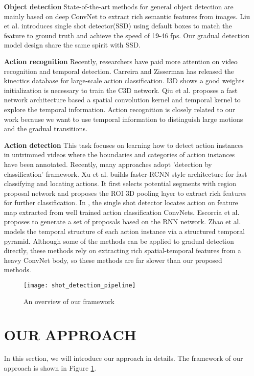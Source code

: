 \documentclass[runningheads]{llncs}
\begin{document}
\textbf{Object detection} State-of-the-art methods for general object detection are mainly based on deep ConvNet to extract rich semantic features from images. Liu et al.\cite{liu2016ssd} introduces single shot detector(SSD) using default boxes to match the feature to ground truth and achieve the speed of 19-46 fps. Our gradual detection model design share the same spirit with SSD.

\textbf{Action recognition} Recently, researchers have paid more attention on video recognition and  temporal detection. Carreira and Zisserman\cite{kay2017kinetics} has released the kinectics database for large-scale action classification. I3D\cite{carreira2017quo} shows a good weights initialization is necessary to train the C3D network. Qiu et al.\cite{qiu2017learning} proposes a fast network architecture based a spatial convolution kernel and temporal kernel to explore the temporal information. Action recognition is closely related to our work because we want to use temporal information to distinguish large motions and the gradual transitions.

\textbf{Action detection} This task focuses on learning how to detect action instances in untrimmed videos where the boundaries and categories of action instances have been annotated. Recently, many approaches adopt 'detection by classification' framework. Xu et al.\cite{xu2017r} builds faster-RCNN style architecture for fast classifying and locating actions. It first selects potential segments with region proposal network and proposes the ROI 3D pooling layer to extract rich features for further classification. In \cite{lin2017single}, the single shot detector locates action on feature map extracted from well trained action classification ConvNets. Escorcia et al.\cite{escorcia2016daps} proposes to generate a set of proposals based on the RNN network. Zhao et al.\cite{zhao2017temporal} models the temporal structure of each action instance via a structured temporal pyramid. Although some of the methods can be applied to gradual detection directly, these methods rely on extracting rich spatial-temporal features from a heavy ConvNet body, so these methods are far slower than our proposed methods. 

\begin{figure}
\centering
\texttt{[image: shot\_detection\_pipeline]}
\caption{An overview of our framework}\label{fig:2}
\end{figure}


\section{OUR APPROACH}
In this section, we will introduce our approach in details. The framework of our approach is shown in Figure \ref{fig:2}.
\end{document}
